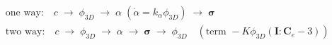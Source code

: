 \documentclass[border=4pt]{standalone}
\begin{document}
$\displaystyle
\begin{aligned}
&\text{one way:}\quad c\;\rightarrow\;\phi_{3D}\;\rightarrow\;\alpha\;(\dot\alpha=k_\alpha\phi_{3D})\;\rightarrow\;\bm\sigma\\[3pt]
&\text{two way:}\quad c\;\rightarrow\;\phi_{3D}\;\rightarrow\;\alpha\;\rightarrow\;\bm\sigma\;\rightarrow\;\phi_{3D}\quad(\text{term } -K\phi_{3D}(\mathbf I:\mathbf C_e-3))
\end{aligned}$
\end{document}
